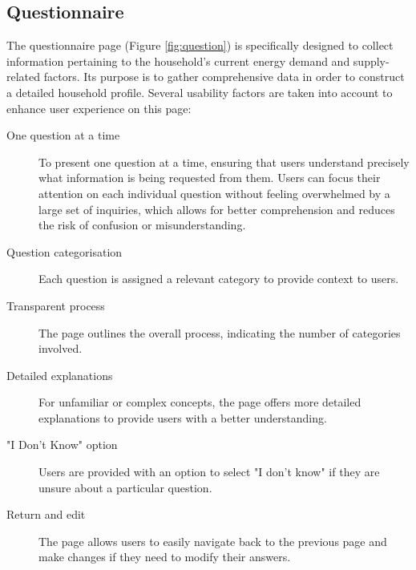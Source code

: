 

\subsection*{Questionnaire}

The questionnaire page (Figure \ref{fig:question}) is specifically designed to collect information pertaining to the household's current energy demand and supply-related factors. 
Its purpose is to gather comprehensive data in order to construct a detailed household profile.
Several usability factors are taken into account to enhance user experience on this page:
\begin{description}
  \item[One question at a time] To present one question at a time, ensuring that users understand precisely what information is being requested from them. 
    Users can focus their attention on each individual question without feeling overwhelmed by a large set of inquiries, which allows for better comprehension and reduces the risk of confusion or misunderstanding. 
  \item[Question categorisation] Each question is assigned a relevant category to provide context to users.
  \item[Transparent process] The page outlines the overall process, indicating the number of categories involved.
  \item[Detailed explanations] For unfamiliar or complex concepts, the page offers more detailed explanations to provide users with a better understanding.
  \item["I Don't Know" option] Users are provided with an option to select "I don't know" if they are unsure about a particular question. 
  \item[Return and edit] The page allows users to easily navigate back to the previous page and make changes if they need to modify their answers. 
\end{description}
